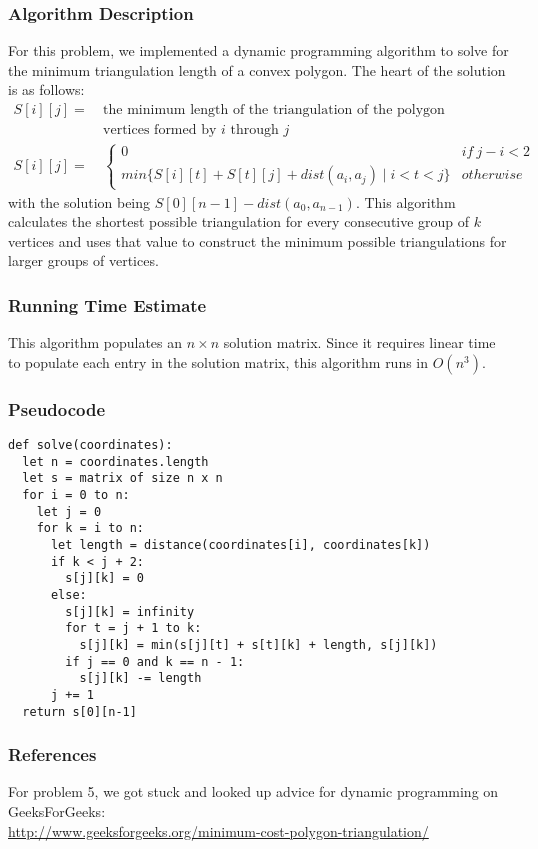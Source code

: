 \documentclass{math}
\begin{document}
\subsubsection*{Algorithm Description}
For this problem, we implemented a dynamic programming algorithm to solve for
the minimum triangulation length of a convex polygon. The heart of the solution
is as follows:
\begin{align*}
  S[i][j] =~ & \text{the minimum length of the triangulation of the polygon} \\
  & \text{vertices formed by } i \text{ through } j \\
  S[i][j] =& \begin{cases}
    0 & if~ j - i < 2 \\
    min\{S[i][t]+S[t][j]+dist(a_i,a_j)\mid i<t<j\} & otherwise
  \end{cases}
\end{align*}
with the solution being \( S[0][n-1]-dist(a_0,a_{n-1}) \). This algorithm
calculates the shortest possible triangulation for every consecutive group of
\( k \) vertices and uses that value to construct the minimum possible
triangulations for larger groups of vertices.

\subsubsection*{Running Time Estimate}
This algorithm populates an \( n\times n \) solution matrix. Since it requires
linear time to populate each entry in the solution matrix, this algorithm runs
in \( O(n^3) \).

\subsubsection*{Pseudocode}
\begin{lstlisting}
def solve(coordinates):
  let n = coordinates.length
  let s = matrix of size n x n
  for i = 0 to n:
    let j = 0
    for k = i to n:
      let length = distance(coordinates[i], coordinates[k])
      if k < j + 2:
        s[j][k] = 0
      else:
        s[j][k] = infinity
        for t = j + 1 to k:
          s[j][k] = min(s[j][t] + s[t][k] + length, s[j][k])
        if j == 0 and k == n - 1:
          s[j][k] -= length
      j += 1
  return s[0][n-1]
\end{lstlisting}

\subsubsection*{References}
For problem 5, we got stuck and looked up advice for dynamic programming on
GeeksForGeeks: \\
\href{http://www.geeksforgeeks.org/minimum-cost-polygon-triangulation/}
{http://www.geeksforgeeks.org/minimum-cost-polygon-triangulation/}
\end{document}
